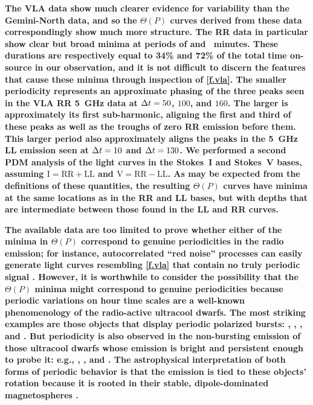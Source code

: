 \documentclass[twocolumn, times]{aastex6}
\begin{document}
\textbf{The VLA data show much clearer evidence for variability than the Gemini-North
data, and so the $\Theta(P)$ curves derived from these data correspondingly
show much more structure. The RR data in particular show clear but broad
minima at periods of  and ~minutes. These durations are
respectively equal to 34\% and 72\% of the total time on-source in our
observation, and it is not difficult to discern the features that cause these
minima through inspection of \autoref{f.vla}. The smaller periodicity
represents an approximate phasing of the three peaks seen in the VLA RR 5~GHz
data at ${\Delta t} = 50$, $100$, and $160$. The larger is approximately its first
sub-harmonic, aligning the first and third of these peaks as well as the
troughs of \apx zero RR emission before them. This larger period also
approximately aligns the peaks in the 5~GHz LL emission seen at ${\Delta t} = 10$ and
${\Delta t} = 130$. We performed a second PDM analysis of the light curves in the
Stokes~I and Stokes~V bases, assuming $\text{I} = \text{RR} + \text{LL}$ and
$\text{V} = \text{RR} - \text{LL}$. As may be expected from the definitions of
these quantities, the resulting $\Theta(P)$ curves have minima at the same
locations as in the RR and LL bases, but with depths that are intermediate
between those found in the LL and RR curves.}

\textbf{The available data are too limited to prove
whether either of the minima in $\Theta(P)$ correspond to genuine
periodicities in the radio emission; for instance, autocorrelated ``red
noise'' processes can easily generate light curves resembling \autoref{f.vla}
that contain no truly periodic signal . However, it is
worthwhile to consider the possibility that the $\Theta(P)$ minima might
correspond to genuine periodicities because periodic variations on \apx hour
time scales are a well-known phenomenology of the radio-active ultracool
dwarfs. The most striking examples are those objects that display periodic
polarized bursts:  \citep{wb15},  \citep{brpb+09},
 \citep{had+08}, and  \citep{had+06}. But
periodicity is also observed in the non-bursting emission of those ultracool
dwarfs whose emission is bright and persistent enough to probe it: e.g.,
,  \citep{brr+05, had+08}, and 
\citep{mbi+11, wbi+15}. The astrophysical interpretation of both forms of
periodic behavior is that the emission is tied to these objects' rotation
because it is rooted in their stable, dipole-dominated magnetospheres
.}
\end{document}
